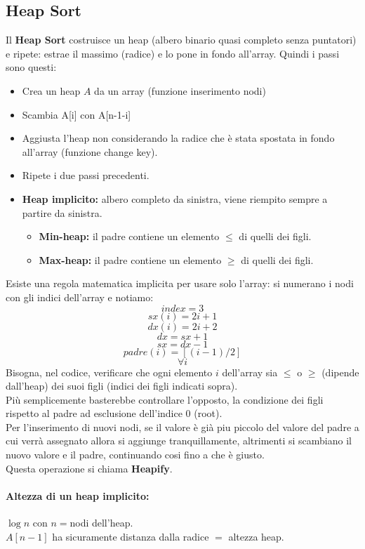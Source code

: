 \documentclass[a4paper,12pt]{article}
\begin{document}
\subsection{Heap Sort}
Il \textbf{Heap Sort} costruisce un heap (albero binario quasi completo senza puntatori) e ripete:
estrae il massimo (radice) e lo pone in fondo all’array.
Quindi i passi sono questi:
\begin{itemize}
  \item Crea un heap $A$ da un array (funzione inserimento nodi)
  \item Scambia A[i] con A[n-1-i]
  \item Aggiusta l'heap non considerando la radice che è stata spostata in fondo all'array (funzione change key).
  \item Ripete i due passi precedenti.
\end{itemize}
\begin{itemize}
  \item \textbf{Heap implicito: }albero completo da sinistra, viene riempito sempre a partire da sinistra.
  \begin{itemize}
    \item \textbf{Min-heap: }il padre contiene un elemento $\leq$ di quelli dei figli.
    \item \textbf{Max-heap: }il padre contiene un elemento $\geq$ di quelli dei figli.
  \end{itemize}
\end{itemize}
Esiste una regola matematica implicita per usare solo l'array: si numerano i nodi con gli indici dell'array e notiamo:
\[
index = 3
\]
\[
sx(i) = 2i+1
\]
\[
dx(i) = 2i+2
\]
\[
dx = sx + 1
\]
\[
sx = dx - 1
\]
\[
padre(i) = [(i-1)/2]
\]
\[
\forall i
\]
Bisogna, nel codice, verificare che ogni elemento $i$ dell'array sia $\leq$ o $\geq$ (dipende dall'heap) dei suoi figli (indici dei figli indicati sopra).\\
Più semplicemente basterebbe controllare l'opposto, la condizione dei figli rispetto al padre ad esclusione dell'indice $0$ (root).\\
Per l'inserimento di nuovi nodi, se il valore è già piu piccolo del valore del padre a cui verrà assegnato allora si aggiunge tranquillamente, altrimenti si scambiano il nuovo valore e il padre, continuando cosi fino a che è giusto.\\
Questa operazione si chiama \textbf{Heapify}.
\paragraph{Altezza di un heap implicito:} $\log n$ con $n = $nodi dell'heap.\\
$A[n-1]$ ha sicuramente distanza dalla radice $=$ altezza heap.
\end{document}
